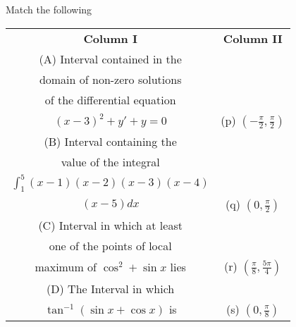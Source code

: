 \item Match the following
\begin{table}[ht!]
\centering
\begin{tabular}{c c} 
 \textbf{Column I} & \textbf{Column II}\\ [0.5ex] 
 (A) Interval contained in the\\ domain of
     non-zero solutions\\ of the differential equation\\
     $(x - 3)^2 + y' + y = 0$                                     &(p) $\left(-\frac{\pi}{2}, \frac{\pi}{2}\right)$\\ 
 (B) Interval containing the\\ value of the integral\\
     $\int_{1}^{5}(x-1)(x-2)(x-3)(x-4)$\\ $(x-5)dx$                    &(q) $\left(0, \frac{\pi}{2}\right)$\\
 (C) Interval in which at least\\ one of the points of
     local\\ maximum of $\cos^{2} + \sin x$ lies                    &(r) $\left(\frac{\pi}{8}, \frac{5\pi}{4}\right)$\\                                                                     
 (D) The Interval in which\\ $\tan^{-1}(\sin x + \cos x)$ is            &(s) $\left(0, \frac{\pi}{8}\right)$\\[1ex] 
\end{tabular}
\end{table}\\














































